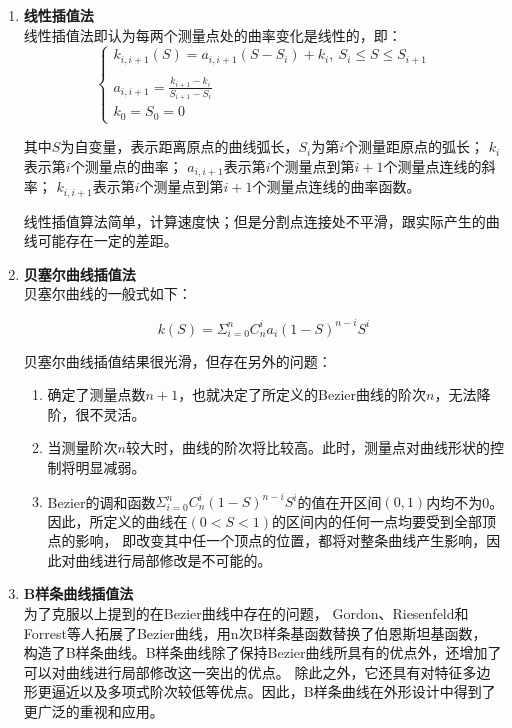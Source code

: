\begin{enumerate}[label=(\Alph*)]
    \item \textbf{线性插值法} \\
    线性插值法即认为每两个测量点处的曲率变化是线性的，即：
    \begin{equation}
    \left\{
        \begin{array}{lr}
        k_{i, i+1} (S) = a_{i, i+1} (S - S_i) + k_i, \ S_i\leq S\leq S_{i+1}\\
    \\
        a_{i, i+1} = \frac{k_{i+1} - k_i}{S_{i+1} - S_i}
    \\
        k_0 = S_0 = 0
        \end{array}
    \right.
    \end{equation}

    其中$S$为自变量，表示距离原点的曲线弧长，$S_i$为第$i$个测量距原点的弧长；
    $k_i$表示第$i$个测量点的曲率；
    $a_{i, i+1}$表示第$i$个测量点到第$i+1$个测量点连线的斜率；
    $k_{i, i+1}$表示第$i$个测量点到第$i+1$个测量点连线的曲率函数。
    
    线性插值算法简单，计算速度快；但是分割点连接处不平滑，跟实际产生的曲线可能存在一定的差距。

    \item \textbf{贝塞尔曲线插值法} \\
    贝塞尔曲线的一般式如下：

    \begin{equation}
        k(S) = \Sigma_{i=0}^nC_n ^ i a_i(1-S)^{n - i}S^i
    \end{equation}

    贝塞尔曲线插值结果很光滑，但存在另外的问题：

    \begin{enumerate}[label=(\alph*)]
        \item 确定了测量点数$n+1$，也就决定了所定义的Bezier曲线的阶次$n$，无法降阶，很不灵活。
        \item 当测量阶次$n$较大时，曲线的阶次将比较高。此时，测量点对曲线形状的控制将明显减弱。
        \item Bezier的调和函数$\Sigma_{i=0}^nC_n ^ i (1-S)^{n - i}S^i$的值在开区间$(0,1)$内均不为0。
        因此，所定义的曲线在$(0<S<1)$的区间内的任何一点均要受到全部顶点的影响，
        即改变其中任一个顶点的位置，都将对整条曲线产生影响，因此对曲线进行局部修改是不可能的。
    \end{enumerate}

    \item \textbf{B样条曲线插值法} \\
    为了克服以上提到的在Bezier曲线中存在的问题，
    Gordon、Riesenfeld和Forrest等人拓展了Bezier曲线，用n次B样条基函数替换了伯恩斯坦基函数，
    构造了B样条曲线。B样条曲线除了保持Bezier曲线所具有的优点外，还增加了可以对曲线进行局部修改这一突出的优点。
    除此之外，它还具有对特征多边形更逼近以及多项式阶次较低等优点。因此，B样条曲线在外形设计中得到了更广泛的重视和应用。


\end{enumerate}
